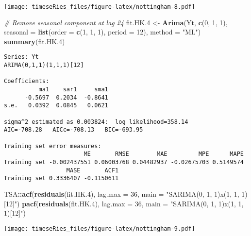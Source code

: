 \documentclass[]{book}
\newenvironment{Shaded}{\begin{snugshade}}{\end{snugshade}}
\newcommand{\CommentTok}[1]{\textcolor[rgb]{0.56,0.35,0.01}{\textit{#1}}}
\newcommand{\DataTypeTok}[1]{\textcolor[rgb]{0.13,0.29,0.53}{#1}}
\newcommand{\DecValTok}[1]{\textcolor[rgb]{0.00,0.00,0.81}{#1}}
\newcommand{\FloatTok}[1]{\textcolor[rgb]{0.00,0.00,0.81}{#1}}
\newcommand{\KeywordTok}[1]{\textcolor[rgb]{0.13,0.29,0.53}{\textbf{#1}}}
\newcommand{\NormalTok}[1]{#1}
\newcommand{\OperatorTok}[1]{\textcolor[rgb]{0.81,0.36,0.00}{\textbf{#1}}}
\newcommand{\StringTok}[1]{\textcolor[rgb]{0.31,0.60,0.02}{#1}}
\begin{document}
\texttt{[image: timeseRies\_files/figure-latex/nottingham-8.pdf]}

\begin{Shaded}
\begin{Highlighting}[]
\CommentTok{# Remove seasonal component at lag 24}
\NormalTok{fit.HK}\FloatTok{.4}\NormalTok{ <-}\StringTok{ }\KeywordTok{Arima}\NormalTok{(Yt, }\KeywordTok{c}\NormalTok{(}\DecValTok{0}\NormalTok{, }\DecValTok{1}\NormalTok{, }\DecValTok{1}\NormalTok{), }\DataTypeTok{seasonal =} \KeywordTok{list}\NormalTok{(}\DataTypeTok{order =} \KeywordTok{c}\NormalTok{(}\DecValTok{1}\NormalTok{, }\DecValTok{1}\NormalTok{, }\DecValTok{1}\NormalTok{), }\DataTypeTok{period =} \DecValTok{12}\NormalTok{), }
    \DataTypeTok{method =} \StringTok{"ML"}\NormalTok{)}
\KeywordTok{summary}\NormalTok{(fit.HK}\FloatTok{.4}\NormalTok{)}
\end{Highlighting}
\end{Shaded}

\begin{verbatim}
Series: Yt 
ARIMA(0,1,1)(1,1,1)[12] 

Coefficients:
          ma1    sar1     sma1
      -0.5697  0.2034  -0.8641
s.e.   0.0392  0.0845   0.0621

sigma^2 estimated as 0.003824:  log likelihood=358.14
AIC=-708.28   AICc=-708.13   BIC=-693.95

Training set error measures:
                       ME       RMSE        MAE         MPE      MAPE
Training set -0.002437551 0.06003768 0.04482937 -0.02675703 0.5149574
                  MASE       ACF1
Training set 0.3336407 -0.1150611
\end{verbatim}

\begin{Shaded}
\begin{Highlighting}[]
\NormalTok{TSA}\OperatorTok{::}\KeywordTok{acf}\NormalTok{(}\KeywordTok{residuals}\NormalTok{(fit.HK}\FloatTok{.4}\NormalTok{), }\DataTypeTok{lag.max =} \DecValTok{36}\NormalTok{, }\DataTypeTok{main =} \StringTok{"SARIMA(0, 1, 1)x(1, 1, 1)[12]"}\NormalTok{)}
\KeywordTok{pacf}\NormalTok{(}\KeywordTok{residuals}\NormalTok{(fit.HK}\FloatTok{.4}\NormalTok{), }\DataTypeTok{lag.max =} \DecValTok{36}\NormalTok{, }\DataTypeTok{main =} \StringTok{"SARIMA(0, 1, 1)x(1, 1, 1)[12]"}\NormalTok{)}
\end{Highlighting}
\end{Shaded}

\texttt{[image: timeseRies\_files/figure-latex/nottingham-9.pdf]}
\end{document}
